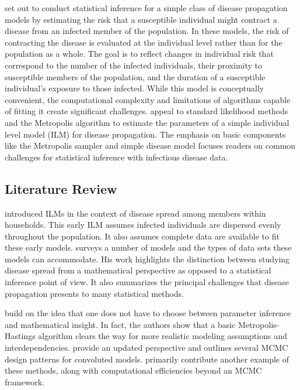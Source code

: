 \documentclass{uwstat572}
\begin{document}
\citet{Brown} set out to conduct statistical inference for a simple class of disease propagation models by estimating the risk that a susceptible individual might contract a disease from an infected member of the population. 
In these models, the risk of contracting the disease is evaluated at the individual level rather than for the population as a whole. 
The goal is to reflect changes in individual risk that correspond to the number of the infected individuals, their proximity to susceptible members of the population, and the duration of a susceptible individual's exposure to those infected. 
While this model is conceptually convenient, the computational complexity and limitations of algorithms capable of fitting it create significant challenges.
\citet{Brown} appeal to standard likelihood methods and the Metropolis algorithm \citep{Metropolis} to estimate the parameters of a simple individual level model (ILM) for disease propagation.
The emphasis on basic components like the Metropolis sampler and simple disease model focuses readers on common challenges for statistical inference with infectious disease data. 

\subsection{Literature Review}
\label{literature_review}
\citet{Haber} introduced ILMs in the context of disease spread among members within households. 
This early ILM assumes infected individuals are dispersed evenly throughout the population. 
It also assumes complete data are available to fit these early models. 
\citet{Becker} surveys a number of models and the types of data sets these models can accommodate. 
His work highlights the distinction between studying disease spread from a mathematical perspective as opposed to a statistical inference point of view.
It also summarizes the principal challenges that disease propagation presents to many statistical methods.

\citet{ONeill} build on the idea that one does not have to choose between parameter inference and mathematical insight. 
In fact, the authors show that a basic Metropolis-Hastings algorithm clears the way for more realistic modeling assumptions and interdependencies. 
\citet{Jewell} provide an updated perspective and outlines several MCMC design patterns for convoluted models.
\citet{Brown} primarily contribute another example of these methods, along with computational efficiencies beyond an MCMC framework. 
\end{document}
